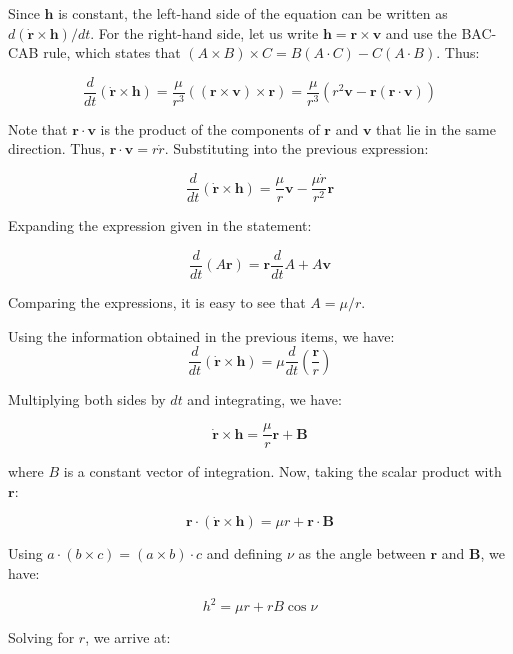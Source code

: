 \documentclass[11pt]{article}
\begin{document}
\begin{pproblem}
\begin{pssolution*}{}{}
\begin{alternativas}
            Since \(\mathbf{h}\) is constant, the left-hand side of the equation can be written as \(d(\dot{\mathbf{r}}\times \mathbf{h})/dt\). For the right-hand side, let us write \(\mathbf{h} = \mathbf{r}\times \mathbf{v}\) and use the BAC-CAB rule, which states that \((A \times B) \times C = B(A\cdot C) - C(A \cdot B)\). Thus:

            \[\frac{d}{dt}(\dot{\mathbf{r}}\times \mathbf{h}) = \frac{\mu}{r^3}((\mathbf{r}\times\mathbf{v})\times \mathbf{r}) = \frac{\mu}{r^3}(r^2\mathbf{v} - \mathbf{r}(\mathbf{r}\cdot \mathbf{v}))\]

            Note that \(\mathbf{r}\cdot\mathbf{v}\) is the product of the components of \(\mathbf{r}\) and \(\mathbf{v}\) that lie in the same direction. Thus, \(\mathbf{r}\cdot\mathbf{v} = r\dot{r}\). Substituting into the previous expression:

            \[\boxed{\frac{d}{dt}(\dot{\mathbf{r}}\times \mathbf{h}) = \frac{\mu}{r}\mathbf{v} - \frac{\mu \dot{r}}{r^2}\mathbf{r}}\]

            \item Expanding the expression given in the statement:
            
            \[\frac{d}{dt}(A\mathbf{r}) = \mathbf{r}\frac{d}{dt}A + A \mathbf{v}\]

            Comparing the expressions, it is easy to see that \(\boxed{A = \mu/r}\).

            \item Using the information obtained in the previous items, we have:
            \[\frac{d}{dt}(\dot{\mathbf{r}}\times \mathbf{h}) = \mu\frac{d}{dt}\left(\frac{\mathbf{r}}{r}\right)\]

            Multiplying both sides by \(dt\) and integrating, we have:

            \[\dot{\mathbf{r}}\times\mathbf{h} = \frac{\mu}{r}\mathbf{r} + \mathbf{B}\]

            where \(B\) is a constant vector of integration. Now, taking the scalar product with \(\mathbf{r}\):

            \[\mathbf{r}\cdot(\dot{\mathbf{r}}\times \mathbf{h}) = \mu r + \mathbf{r}\cdot\mathbf{B}\]

            Using \(a\cdot(b\times c) = (a\times b)\cdot c\) and defining \(\nu\) as the angle between \(\mathbf{r}\) and \(\mathbf{B}\), we have:

            \[h^2 = \mu r + rB\cos\nu\]

            Solving for \(r\), we arrive at:


\end{alternativas}
\end{pssolution*}
\end{pproblem}
\end{document}
